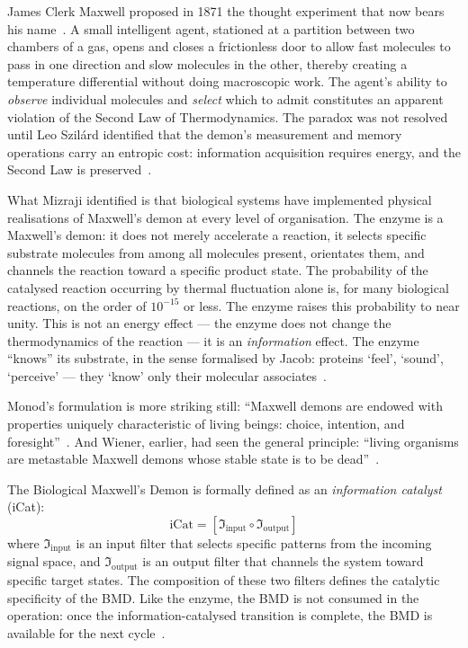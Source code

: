 James Clerk Maxwell proposed in 1871 the thought experiment that now bears his name~\cite{maxwell1871}. A small intelligent agent, stationed at a partition between two chambers of a gas, opens and closes a frictionless door to allow fast molecules to pass in one direction and slow molecules in the other, thereby creating a temperature differential without doing macroscopic work. The agent's ability to \textit{observe} individual molecules and \textit{select} which to admit constitutes an apparent violation of the Second Law of Thermodynamics. The paradox was not resolved until Leo Szil\'ard identified that the demon's measurement and memory operations carry an entropic cost: information acquisition requires energy, and the Second Law is preserved~\cite{leff1990}.

What Mizraji identified is that biological systems have implemented physical realisations of Maxwell's demon at every level of organisation. The enzyme is a Maxwell's demon: it does not merely accelerate a reaction, it selects specific substrate molecules from among all molecules present, orientates them, and channels the reaction toward a specific product state. The probability of the catalysed reaction occurring by thermal fluctuation alone is, for many biological reactions, on the order of $10^{-15}$ or less. The enzyme raises this probability to near unity. This is not an energy effect --- the enzyme does not change the thermodynamics of the reaction --- it is an \textit{information} effect. The enzyme ``knows'' its substrate, in the sense formalised by Jacob: proteins `feel', `sound', `perceive' --- they `know' only their molecular associates~\cite{jacob1977}.

Monod's formulation is more striking still: ``Maxwell demons are endowed with properties uniquely characteristic of living beings: choice, intention, and foresight''~\cite{monod1972}. And Wiener, earlier, had seen the general principle: ``living organisms are metastable Maxwell demons whose stable state is to be dead''~\cite{wiener1961}.

The Biological Maxwell's Demon is formally defined as an \textit{information catalyst} (iCat):
%
\begin{equation}
\text{iCat} = \left[\mathfrak{I}_{\mathrm{input}} \circ \mathfrak{I}_{\mathrm{output}}\right]
\label{eq:bmd}
\end{equation}
%
where $\mathfrak{I}_{\mathrm{input}}$ is an input filter that selects specific patterns from the incoming signal space, and $\mathfrak{I}_{\mathrm{output}}$ is an output filter that channels the system toward specific target states. The composition of these two filters defines the catalytic specificity of the BMD. Like the enzyme, the BMD is not consumed in the operation: once the information-catalysed transition is complete, the BMD is available for the next cycle~\cite{mizraji2021}.

